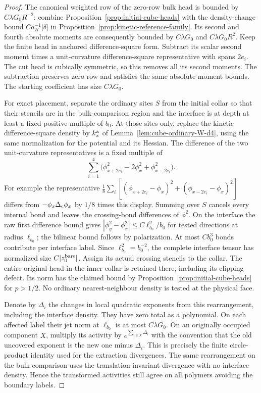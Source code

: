 \documentclass[11pt]{article}
\theoremstyle{definition}
\begin{document}
\begin{proof}
The canonical weighted row of the zero-row bulk
head is bounded by \(C\lambda G_0R^{-2}\):
combine Proposition~\ref{prop:initial-cube-heads}
with the density-change bound
\(C a_R^{-1}|\delta|\) in
Proposition~\ref{prop:kinetic-reference-family}.
Its second and fourth absolute moments are consequently
bounded by \(C\lambda G_0\) and \(C\lambda G_0R^2\).
Keep the finite head in anchored difference-square form.
Subtract its scalar second moment times a unit-curvature
difference-square representative with spans \(2e_i\).
The cut head is cubically symmetric, so this removes
all its second moments. The subtraction preserves zero
row and satisfies the same absolute moment bounds.
The starting coefficient has size \(C\lambda G_0\).

For exact placement, separate the ordinary sites \(S\)
from the initial collar so that their stencils are in
the bulk-comparison region and the interface is at
depth at least a fixed positive multiple of \(b_0\).
At those sites only, replace the kinetic difference-square
density by \(k_x^{\rm a}\) of
Lemma~\ref{lem:cube-ordinary-W-d4}, using the same
normalization for the potential and its Hessian. The
difference of the two unit-curvature representatives
is a fixed multiple of
\begin{equation}
 \sum_{i=1}^4
 \bigl(\phi_{x+2e_i}^2-2\phi_x^2+\phi_{x-2e_i}^2\bigr).
\end{equation}
For example the representative
\(\tfrac18\sum_i[(\phi_{x+2e_i}-\phi_x)^2+
(\phi_{x-2e_i}-\phi_x)^2]\) differs from
\(-\phi_x\Delta_{\rm c}\phi_x\) by \(1/8\) times this
display. Summing over \(S\) cancels every internal bond
and leaves the crossing-bond differences of \(\phi^2\).
On the interface the raw first difference bound gives
\(|\phi_y^2-\phi_x^2|\le C\ell_{b_0}^2/b_0\)
for tested directions at radius \(\ell_{b_0}\); the
bilinear bound follows by polarization. At most
\(Cb_0^3\) bonds contribute per interface label.
Since \(\ell_{b_0}^2=b_0^{-2}\), the complete interface
tensor has normalized size \(C|z_0^{\rm bare}|\).
Assign its actual crossing stencils to the collar.
The entire original head in the inner collar is
retained there, including its clipping defect. Its
norm has the claimed bound by
Proposition~\ref{prop:initial-cube-heads} for
\(p>1/2\). No ordinary nearest-neighbour density is
tested at the physical face.

Denote by \(\Delta_i\) the changes in local quadratic
exponents from this rearrangement, including the
interface density. They have zero total as a polynomial.
On each affected label their jet norm at \(\ell_{b_0}\)
is at most \(C\lambda G_0\). On an originally occupied
component \(X\), multiply its activity by
\(e^{\sum_{i\in X}\Delta_i}\) with the convention that
the old uncovered exponent is the new one minus
\(\Delta_i\). This is precisely the finite circle-product
identity used for the extraction divergences. The same
rearrangement on the bulk comparison uses the
translation-invariant divergence with no interface
density. Hence the transformed activities still agree
on all polymers avoiding the boundary labels.


\end{proof}
\end{document}
